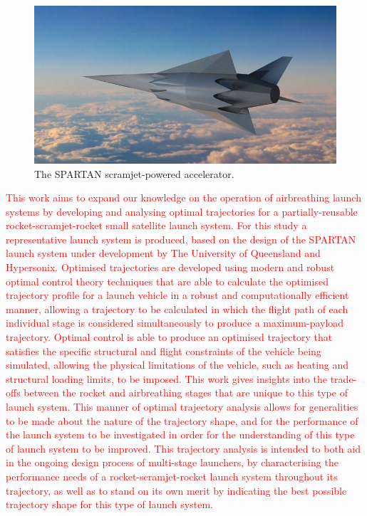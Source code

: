   	     	  	\begin{figure}[ht]
  	     	  		\centering
  	     	  		\includegraphics[width=0.6\linewidth]{figures/1_introduction/project-spartan}
  	     	  		\caption{The SPARTAN scramjet-powered accelerator\cite{BBC}.}
  	     	  		\label{fig:project-spartan}
  	     	  	\end{figure}
  	   \textcolor{red}{
  	   This work aims to expand our knowledge on the operation of airbreathing launch systems by developing and analysing optimal trajectories for a partially-reusable rocket-scramjet-rocket small satellite launch system. For this study a representative launch system is produced, based on the design of the SPARTAN launch system under development by The University of Queensland and Hypersonix\cite{Preller2017b}.
  	   Optimised trajectories are developed using modern and robust optimal control theory techniques that are able to calculate the optimised trajectory profile for a launch vehicle in a robust and computationally efficient manner, allowing a trajectory to be calculated in which the flight path of each individual stage is considered simultaneously to produce a maximum-payload trajectory\cite{Betts1998}. 
  	   Optimal control is able to produce an optimised trajectory that satisfies the specific structural and flight constraints of the vehicle being simulated, allowing the physical limitations of the vehicle, such as heating and structural loading limits, to be imposed\cite{Betts1998}.
  	   This work gives insights into the trade-offs between the rocket and airbreathing stages that are unique to this type of launch system. This manner of optimal trajectory analysis allows for generalities to be made about the nature of the trajectory shape, and for the performance of the launch system to be investigated in order for the understanding of this type of launch system to be improved.
  	   This trajectory analysis is intended to both aid in the ongoing design process of multi-stage launchers, by characterising the performance needs of a rocket-scramjet-rocket launch system throughout its trajectory, as well as to stand on its own merit by indicating the best possible trajectory shape for this type of launch system. 
  	}
  	   
